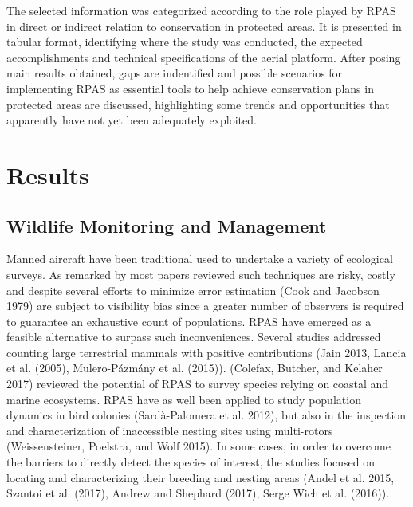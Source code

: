\documentclass[]{interact}
\theoremstyle{plain}%
\theoremstyle{definition}
\theoremstyle{remark}
\begin{document}
The selected information was categorized according to the role played by
RPAS in direct or indirect relation to conservation in protected areas.
It is presented in tabular format, identifying where the study was
conducted, the expected accomplishments and technical specifications of
the aerial platform. After posing main results obtained, gaps are
indentified and possible scenarios for implementing RPAS as essential
tools to help achieve conservation plans in protected areas are
discussed, highlighting some trends and opportunities that apparently
have not yet been adequately exploited.

\section{Results}\label{results}

\subsection{Wildlife Monitoring and
Management}\label{wildlife-monitoring-and-management}

Manned aircraft have been traditional used to undertake a variety of
ecological surveys. As remarked by most papers reviewed such techniques
are risky, costly and despite several efforts to minimize error
estimation (Cook and Jacobson 1979) are subject to visibility bias since
a greater number of observers is required to guarantee an exhaustive
count of populations. RPAS have emerged as a feasible alternative to
surpass such inconveniences. Several studies addressed counting large
terrestrial mammals with positive contributions (Jain 2013, Lancia et
al. (2005), Mulero-Pázmány et al. (2015)). (Colefax, Butcher, and
Kelaher 2017) reviewed the potential of RPAS to survey species relying
on coastal and marine ecosystems. RPAS have as well been applied to
study population dynamics in bird colonies (Sardà-Palomera et al. 2012),
but also in the inspection and characterization of inaccessible nesting
sites using multi-rotors (Weissensteiner, Poelstra, and Wolf 2015). In
some cases, in order to overcome the barriers to directly detect the
species of interest, the studies focused on locating and characterizing
their breeding and nesting areas (Andel et al. 2015, Szantoi et al.
(2017), Andrew and Shephard (2017), Serge Wich et al. (2016)).
\end{document}
